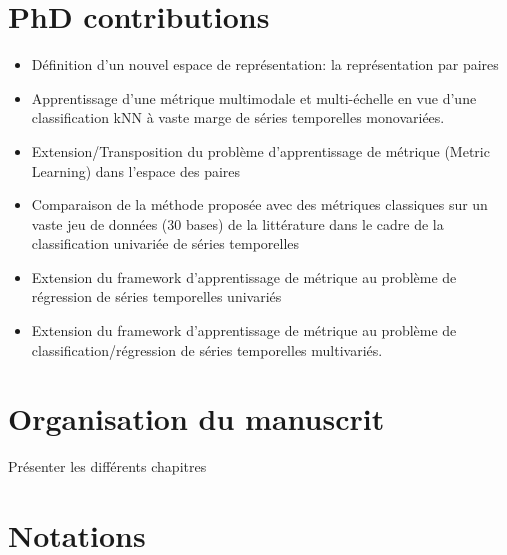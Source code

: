 \section*{PhD contributions}
\begin{itemize}
	\item Définition d’un nouvel espace de représentation: la représentation par paires
	\item Apprentissage d’une métrique multimodale et multi-échelle en vue d’une classification kNN à vaste marge de séries temporelles monovariées.
	\item Extension/Transposition du problème d’apprentissage de métrique (Metric Learning) dans l’espace des paires
	\item Comparaison de la méthode proposée avec des métriques classiques sur un vaste jeu de données (30 bases) de la littérature dans le cadre de la classification univariée de séries temporelles
	\item Extension du framework d’apprentissage de métrique au problème de régression de séries temporelles univariés
	\item Extension du framework d’apprentissage de métrique au problème de classification/régression de séries temporelles multivariés. 
\end{itemize}

\section*{Organisation du manuscrit}
Présenter les différents chapitres

\newpage
\section*{Notations}

